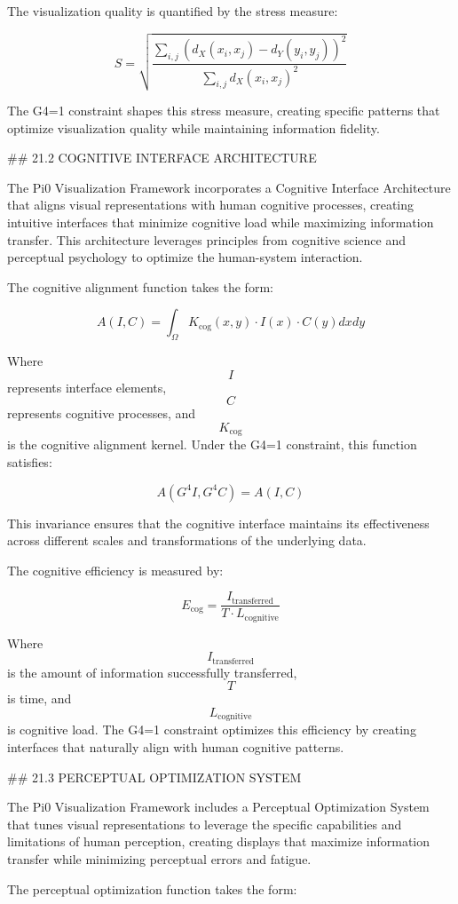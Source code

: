 The visualization quality is quantified by the stress measure:

$$ S = \sqrt{\frac{\sum_{i,j} (d_X(x_i, x_j) - d_Y(y_i, y_j))^2}{\sum_{i,j} d_X(x_i, x_j)^2}} $$

The G4=1 constraint shapes this stress measure, creating specific patterns that optimize visualization quality while maintaining information fidelity.

## 21.2 COGNITIVE INTERFACE ARCHITECTURE

The Pi0 Visualization Framework incorporates a Cognitive Interface Architecture that aligns visual representations with human cognitive processes, creating intuitive interfaces that minimize cognitive load while maximizing information transfer. This architecture leverages principles from cognitive science and perceptual psychology to optimize the human-system interaction.

The cognitive alignment function takes the form:

$$ A(I, C) = \int_{\Omega} K_{\text{cog}}(x, y) \cdot I(x) \cdot C(y) dx dy $$

Where $$ I $$ represents interface elements, $$ C $$ represents cognitive processes, and $$ K_{\text{cog}} $$ is the cognitive alignment kernel. Under the G4=1 constraint, this function satisfies:

$$ A(G^4 I, G^4 C) = A(I, C) $$

This invariance ensures that the cognitive interface maintains its effectiveness across different scales and transformations of the underlying data.

The cognitive efficiency is measured by:

$$ E_{\text{cog}} = \frac{I_{\text{transferred}}}{T \cdot L_{\text{cognitive}}} $$

Where $$ I_{\text{transferred}} $$ is the amount of information successfully transferred, $$ T $$ is time, and $$ L_{\text{cognitive}} $$ is cognitive load. The G4=1 constraint optimizes this efficiency by creating interfaces that naturally align with human cognitive patterns.

## 21.3 PERCEPTUAL OPTIMIZATION SYSTEM

The Pi0 Visualization Framework includes a Perceptual Optimization System that tunes visual representations to leverage the specific capabilities and limitations of human perception, creating displays that maximize information transfer while minimizing perceptual errors and fatigue.

The perceptual optimization function takes the form:

